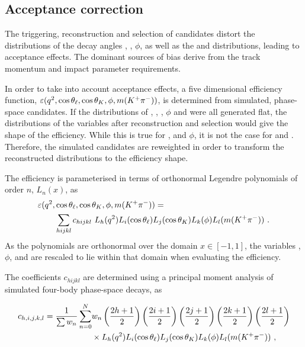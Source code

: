 \subsection{Acceptance correction}
\label{sec:kpimm:acceptance}

The triggering, reconstruction and selection of candidates distort the distributions of the decay angles \ctl, \ctk, $\phi$, as well as the \qsq and \mkpi distributions, leading to acceptance effects. The dominant sources of bias derive from the track momentum and impact parameter requirements. 

In order to take into account acceptance effects, a five dimensional efficiency function, $\varepsilon({q^2},\cos{\theta_\ell},\cos{\theta_K},\phi,m({{K}^+}{{\pi}^-}))$, is determined from simulated, phase-space \BdToKpimm candidates. If the distributions of \qsq, \ctl, \ctk, $\phi$ and \mkpi were all generated flat, the distributions of the variables after reconstruction and selection would give the shape of the efficiency.  While this is true for \ctl, \ctk and $\phi$, it is not the case for \qsq and \mkpi. Therefore, the simulated candidates are reweighted in order to transform the reconstructed distributions to the efficiency shape.

The efficiency is parameterised in terms of orthonormal Legendre polynomials of order $n$, $L_n(x)$, as
\begin{equation}
\begin{split}
  \varepsilon({q^2},&\cos{\theta_\ell},\cos{\theta_K},\phi,m({{K}^+}{{\pi}^-})) = \\
  & \sum_{hijkl} c_{hijkl}~L_{h}({q^2})L_{i}(\cos{\theta_\ell})L_{j}(\cos{\theta_K})L_{k}(\phi)L_{l}(m({{K}^+}{{\pi}^-}))~.
\end{split}  
\label{eqn:legendre}
\end{equation}
As the polynomials are orthonormal over the domain $x\in[-1,1]$, the variables \qsq, $\phi$, and \mkpi are rescaled to lie within that domain when evaluating the efficiency.

The coefficients $c_{hijkl}$ are determined using a principal moment analysis of simulated four-body \BdToKpimm phase-space decays, as

\begin{equation}
   \begin{split}
     c_{h,i,j,k,l} = \frac{1}{\sum w_{n}}\sum_{n=0}^{N}&w_{n}\left(\frac{2h+1}{2}\right)\left(\frac{2i+1}{2}\right)\left(\frac{2j+1}{2}\right)\left(\frac{2k+1}{2}\right)\left(\frac{2l+1}{2}\right)\\
     &\times L_{h}({q^2})L_{i}(\cos{\theta_\ell})L_{j}(\cos{\theta_K})L_{k}(\phi)L_{l}(m({{K}^+}{{\pi}^-}))~,
     \end{split}
 \end{equation}

